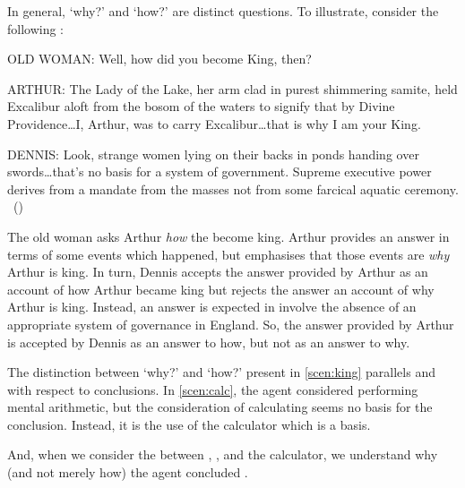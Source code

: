 \begin{note}
  In general, `why?' and `how?' are distinct questions.
  To illustrate, consider the following \scen{}:

  \begin{scenario}[England AD 932]
    \label{scen:king}
    \vspace{-\baselineskip}
    \begin{screenplay}
    \item[OLD WOMAN:]
      Well, how did you become King, then?
    \item[ARTHUR:]
      The Lady of the Lake, her arm clad in purest shimmering samite, held Excalibur aloft from the bosom of the waters to signify that by Divine Providence\space\dots\space I, Arthur, was to carry Excalibur\dots\space that is why I am your King.
    \item[DENNIS:]
      Look, strange women lying on their backs in ponds handing over swords\space\dots\space that's no basis for a system of government.
      Supreme executive power derives from a mandate from the masses not from some farcical aquatic ceremony.\newline
      \mbox{ }\hfill\mbox{(\cite[8--9]{Cleese:1974aa})}
    \end{screenplay}
    \vspace{-\baselineskip}
  \end{scenario}

  The old woman asks Arthur \emph{how} the become king.
  Arthur provides an answer in terms of some events which happened, but emphasises that those events are \emph{why} Arthur is king.
  In turn, Dennis accepts the answer provided by Arthur as an account of how Arthur became king but rejects the answer an account of why Arthur is king.
  Instead, an answer is expected in involve the absence of an appropriate system of governance in England.
  So, the answer provided by Arthur is accepted by Dennis as an answer to how, but not as an answer to why.

  The distinction between `why?' and `how?' present in \autoref{scen:king} parallels \qWhy{} and \qHow{} with respect to conclusions.
  In \autoref{scen:calc}, the agent considered performing mental arithmetic, but the consideration of calculating \gistCalcEq{} seems no basis for the conclusion.
  Instead, it is the use of the calculator which is a basis.

  And, when we consider the \ros{} between \propM{\gistCalcEq{}}, , and the calculator, we understand why (and not merely how) the agent concluded \gistCalcEq{}.
\end{note}

